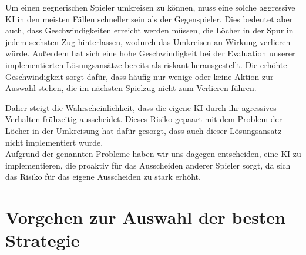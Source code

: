 Um einen gegnerischen Spieler umkreisen zu können, muss eine solche aggressive \ac{KI} in den meisten Fällen schneller
sein als der Gegenspieler.
Dies bedeutet aber auch, dass Geschwindigkeiten erreicht werden müssen, die Löcher in der Spur in jedem sechsten Zug
hinterlassen, wodurch das Umkreisen an Wirkung verlieren würde.
Außerdem hat sich eine hohe Geschwindigkeit bei der Evaluation unserer implementierten Lösungsansätze bereits als
riskant herausgestellt.
Die erhöhte Geschwindigkeit sorgt dafür, dass häufig nur wenige oder keine Aktion zur Auswahl stehen, die im
nächsten Spielzug nicht zum Verlieren führen.

Daher steigt die Wahrscheinlichkeit, dass die eigene \ac{KI} durch ihr agressives Verhalten frühzeitig ausscheidet.
Dieses Risiko gepaart mit dem Problem der Löcher in der Umkreisung hat dafür gesorgt, dass auch dieser Lösungsansatz
nicht implementiert wurde. \\

Aufgrund der genannten Probleme haben wir uns dagegen entscheiden, eine \ac{KI} zu implementieren, die proaktiv für das
Ausscheiden anderer Spieler sorgt, da sich das Risiko für das eigene Ausscheiden zu stark erhöht.

\section{Vorgehen zur Auswahl der besten Strategie}
\label{sec:vorgehen-strategieauswahl}

